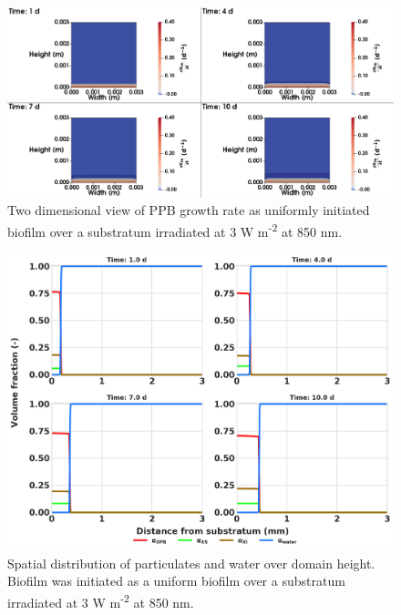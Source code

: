 \begin{figure}[H]
    \centering
     \hspace*{-1cm}\includegraphics[width=1.1\textwidth,height=0.4\textheight]{Chap4/methods/data/figures/case3_growth_frac.png}
    \caption{Two dimensional view of PPB growth rate as uniformly initiated biofilm over a substratum irradiated at 3 W m\textsuperscript{-2} at 850 nm.} 
    \label{fig:case3_growth_frac}
\end{figure}

\begin{figure}[H]
    \centering
    \includegraphics[width=\textwidth,height=0.45\textheight]{Chap4/methods/output/case3.png}
    \caption{Spatial distribution of particulates and water over domain height. Biofilm was initiated as a uniform biofilm over a substratum irradiated at 3 W m\textsuperscript{-2} at 850 nm.} 
    \label{fig:case3_dist_frac}
\end{figure}




